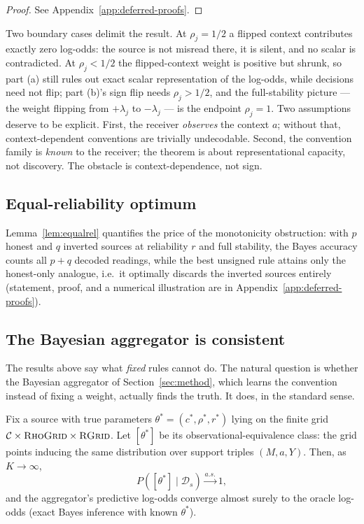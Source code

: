 \begin{proof}
See Appendix~\ref{app:deferred-proofs}.
\end{proof}

\begin{remark}
Two boundary cases delimit the result. At $\rho_j = 1/2$ a flipped
context contributes exactly zero log-odds: the source is not misread
there, it is silent, and no scalar is contradicted. At
$\rho_j < 1/2$ the flipped-context weight is positive but shrunk, so
part (a) still rules out exact scalar representation of the log-odds,
while decisions need not flip; part (b)'s sign flip needs
$\rho_j > 1/2$, and the full-stability picture --- the weight flipping
from $+\lambda_j$ to $-\lambda_j$ --- is the endpoint $\rho_j = 1$.
Two assumptions deserve to be explicit. First, the receiver
\emph{observes} the context $a$; without that, context-dependent
conventions are trivially undecodable. Second, the convention family
is \emph{known} to the receiver; the theorem is about representational
capacity, not discovery. The obstacle is context-dependence, not sign.
\end{remark}

\subsection{Equal-reliability optimum}

Lemma~\ref{lem:equalrel} quantifies the price of the monotonicity
obstruction: with $p$ honest and $q$ inverted sources at reliability $r$
and full stability, the Bayes accuracy counts all $p+q$ decoded readings,
while the best unsigned rule attains only the honest-only analogue, i.e.\
it optimally discards the inverted sources entirely (statement, proof, and
a numerical illustration are in Appendix~\ref{app:deferred-proofs}).

\subsection{The Bayesian aggregator is consistent}

The results above say what \emph{fixed} rules cannot do. The natural
question is whether the Bayesian aggregator of
Section~\ref{sec:method}, which learns the convention instead of fixing a
weight, actually finds the truth. It does, in the standard sense.

\begin{theorem}
\label{thm:consistency}
Fix a source with true parameters $\theta^* = (c^*, \rho^*, r^*)$ lying on
the finite grid $\mathcal{C} \times \textsc{RhoGrid} \times \textsc{RGrid}$.
Let $[\theta^*]$ be its observational-equivalence class: the grid points
inducing the same distribution over support triples $(M, a, Y)$. Then, as
$K \to \infty$,
\[
P([\theta^*] \mid \mathcal{D}_s) \xrightarrow{a.s.} 1,
\]
and the aggregator's predictive log-odds converge almost surely to the
oracle log-odds (exact Bayes inference with known $\theta^*$).
\end{theorem}

